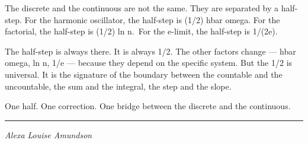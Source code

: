 \documentclass[
]{article}
\begin{document}
The discrete and the continuous are not the same. They are separated by
a half-step. For the harmonic oscillator, the half-step is (1/2) hbar
omega. For the factorial, the half-step is (1/2) ln n.~For the e-limit,
the half-step is 1/(2e).

The half-step is always there. It is always 1/2. The other factors
change --- hbar omega, ln n, 1/e --- because they depend on the specific
system. But the 1/2 is universal. It is the signature of the boundary
between the countable and the uncountable, the sum and the integral, the
step and the slope.

One half. One correction. One bridge between the discrete and the
continuous.

\begin{center}\rule{0.5\linewidth}{0.5pt}\end{center}

\emph{Alexa Louise Amundson}
\end{document}
